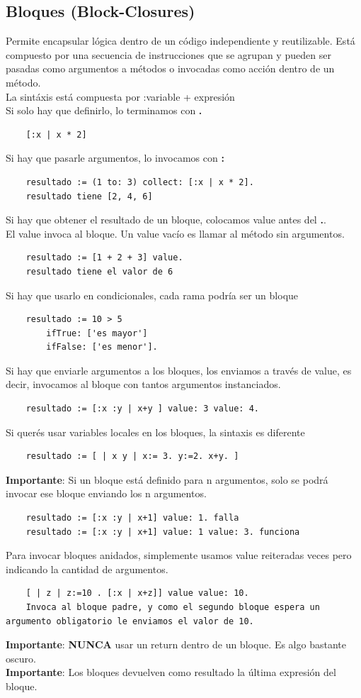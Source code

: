 \documentclass[10pt,a4paper]{article}
\begin{document}
\subsection*{Bloques (Block-Closures)}
Permite encapsular lógica dentro de un código independiente y reutilizable. Está compuesto por una secuencia de instrucciones que se agrupan y pueden ser pasadas como argumentos a métodos o invocadas como acción dentro de un método. \\
La sintáxis está compuesta por :variable + expresión \\
Si solo hay que definirlo, lo terminamos con \textbf{.}
\begin{lstlisting}
    [:x | x * 2]
\end{lstlisting}
Si hay que pasarle argumentos, lo invocamos con \textbf{:}
\begin{lstlisting}
    resultado := (1 to: 3) collect: [:x | x * 2].
    resultado tiene [2, 4, 6]
\end{lstlisting}
Si hay que obtener el resultado de un bloque, colocamos value antes del \textbf{.}. \\
El value invoca al bloque. Un value vacío es llamar al método sin argumentos.
\begin{lstlisting}
    resultado := [1 + 2 + 3] value. 
    resultado tiene el valor de 6
\end{lstlisting}
Si hay que usarlo en condicionales, cada rama podría ser un bloque 
\begin{lstlisting}
    resultado := 10 > 5 
        ifTrue: ['es mayor']
        ifFalse: ['es menor'].
\end{lstlisting}
Si hay que enviarle argumentos a los bloques, los enviamos a través de value, es decir, invocamos al bloque con tantos argumentos instanciados.
\begin{lstlisting}
    resultado := [:x :y | x+y ] value: 3 value: 4.
\end{lstlisting} 
Si querés usar variables locales en los bloques, la sintaxis es diferente 
\begin{lstlisting}
    resultado := [ | x y | x:= 3. y:=2. x+y. ]
\end{lstlisting}
\textbf{Importante}: Si un bloque está definido para n argumentos, solo se podrá invocar ese bloque enviando los n argumentos.
\begin{lstlisting}
    resultado := [:x :y | x+1] value: 1. falla 
    resultado := [:x :y | x+1] value: 1 value: 3. funciona
\end{lstlisting}
Para invocar bloques anidados, simplemente usamos value reiteradas veces pero indicando la cantidad de argumentos.
\begin{lstlisting}
    [ | z | z:=10 . [:x | x+z]] value value: 10.
    Invoca al bloque padre, y como el segundo bloque espera un argumento obligatorio le enviamos el valor de 10. 
\end{lstlisting}
\textbf{Importante}: \textbf{NUNCA} usar un return dentro de un bloque. Es algo bastante oscuro. \\
\textbf{Importante}: Los bloques devuelven como resultado la última expresión del bloque.
\end{document}
